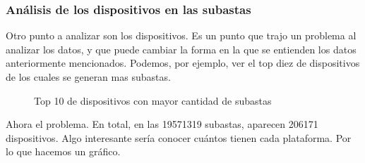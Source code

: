 \documentclass[a4paper, 12pt]{article}
\newcommand\tab[1][1cm]{\hspace*{#1}}
\begin{document}
	\subsubsection{Análisis de los dispositivos en las subastas}
	\tab Otro punto a analizar son los dispositivos. Es un punto que trajo un problema al analizar los datos, y que puede cambiar la forma en la que se entienden los datos anteriormente mencionados.
	Podemos, por ejemplo, ver el top diez de dispositivos de los cuales se generan mas subastas.
	\FloatBarrier
		\begin{figure}
			\centering
		   	\caption{Top 10 de dispositivos con mayor cantidad de subastas}
			\label{top10devicessubastas}
		\end{figure}
	\FloatBarrier

	\tab Ahora el problema.\newline
	\tab En total, en las 19571319 subastas, aparecen 206171 dispositivos. Algo interesante sería conocer cuántos tienen cada plataforma. Por lo que hacemos un gráfico.
\end{document}
